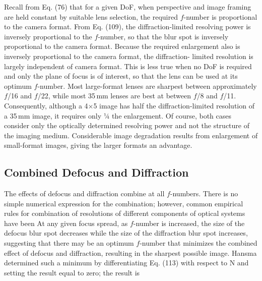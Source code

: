 \documentclass[11pt, oneside]{scrartcl}   	%
\begin{document}
Recall from Eq. (76) that for a given DoF, when perspective and
image framing are held constant by suitable lens selection, the
required $f$-number is proportional to the camera format. From
Eq. (109), the diffraction-limited resolving power is inversely
proportional to the $f$-number, so that the blur spot is inversely proportional to the camera format. Because the required enlargement also is inversely proportional to the camera format, the diffraction- limited resolution is largely independent of camera format. This is less true when no DoF is required and only the plane of focus is of interest, so that the lens can be used at its optimum $f$-number. Most large-format lenses are sharpest between approximately $f$/16 and $f$/22, while most 35\,mm lenses are best at between $f$/8 and $f$/11. Consequently, although a 4$\times$5 image has half the diffraction-limited resolution of a 35\,mm image, it requires only 1⁄4 the enlargement. Of course, both cases consider only the optically determined resolving power and not the structure of the imaging medium. Considerable image degradation results from enlargement of small-format images, giving the larger formats an advantage.

\subsection{Combined Defocus and Diffraction}
\label{sec:comb-defoc-diffr}


The effects of defocus and diffraction combine at all $f$-numbers. There is no simple numerical expression for the combination; however, common empirical rules for combination of resolutions of different components of optical systems have been
At any given focus spread, as $f$-number is increased, the size of the defocus blur spot decreases while the size of the diffraction blur spot increases, suggesting that there may be an optimum $f$-number that minimizes the combined effect of defocus and diffraction, resulting in the sharpest possible image. Hansma determined such a minimum by differentiating Eq. (113) with respect to N and setting the result equal to zero; the result is
\end{document}

